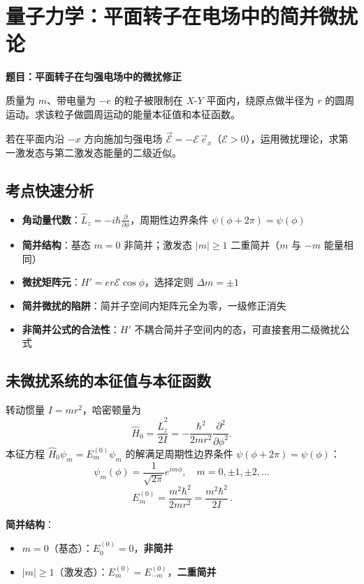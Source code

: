 
\section{量子力学：平面转子在电场中的简并微扰论}
\label{sec:planar-rotator}

\begin{modelbox}[平面转子在匀强电场中的微扰修正]
\textbf{题目：平面转子在匀强电场中的微扰修正}

质量为 $m$、带电量为 $-e$ 的粒子被限制在 $X$-$Y$ 平面内，绕原点做半径为 $r$ 的圆周运动。求该粒子做圆周运动的能量本征值和本征函数。

若在平面内沿 $-x$ 方向施加匀强电场 $\vec{\mathscr{E}} = -\mathscr{E}\,\vec{e}_x$（$\mathscr{E}>0$），运用微扰理论，求第一激发态与第二激发态能量的二级近似。
\end{modelbox}

\subsection{考点快速分析}

\begin{tipbox}[考点快速分析]
\begin{itemize}
    \item \textbf{角动量代数}：$\hat{L}_z = -i\hbar\frac{\partial}{\partial\phi}$，周期性边界条件 $\psi(\phi+2\pi)=\psi(\phi)$
    \item \textbf{简并结构}：基态 $m=0$ 非简并；激发态 $|m|\geq 1$ 二重简并（$m$ 与 $-m$ 能量相同）
    \item \textbf{微扰矩阵元}：$H' = er\mathscr{E}\cos\phi$，选择定则 $\Delta m = \pm 1$
    \item \textbf{简并微扰的陷阱}：简并子空间内矩阵元全为零，一级修正消失
    \item \textbf{非简并公式的合法性}：$H'$ 不耦合简并子空间内的态，可直接套用二级微扰公式
\end{itemize}
\end{tipbox}

\subsection{未微扰系统的本征值与本征函数}

\begin{derivationbox}[未微扰系统的本征值与本征函数]
转动惯量 $I = mr^2$，哈密顿量为
\[
\hat{H}_0 = \frac{\hat{L}_z^2}{2I} = -\frac{\hbar^2}{2mr^2}\frac{\partial^2}{\partial\phi^2}.
\]
本征方程 $\hat{H}_0\psi_m = E_m^{(0)}\psi_m$ 的解满足周期性边界条件 $\psi(\phi+2\pi)=\psi(\phi)$：
\[
\boxed{\,\psi_m(\phi) = \frac{1}{\sqrt{2\pi}}e^{im\phi},\quad m = 0, \pm 1, \pm 2, \dots\,}
\]
\[
\boxed{\,E_m^{(0)} = \frac{m^2\hbar^2}{2mr^2} = \frac{m^2\hbar^2}{2I}\,}.
\]

\textbf{简并结构}：
\begin{itemize}
    \item $m=0$（基态）：$E_0^{(0)}=0$，\textbf{非简并}
    \item $|m|\geq 1$（激发态）：$E_m^{(0)} = E_{-m}^{(0)}$，\textbf{二重简并}
\end{itemize}
\end{derivationbox}

